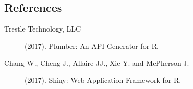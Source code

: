 \documentclass[12pt,a4paper]{article}
\begin{document}


\subsection*{References}
\small
\begin{description}
\item[Trestle Technology, LLC] (2017).
       Plumber: An API Generator for R.
\item[Chang W., Cheng J., Allaire JJ., Xie Y. and McPherson J.] (2017).
       Shiny: Web Application Framework for R.

\end{description}
\end{document}
